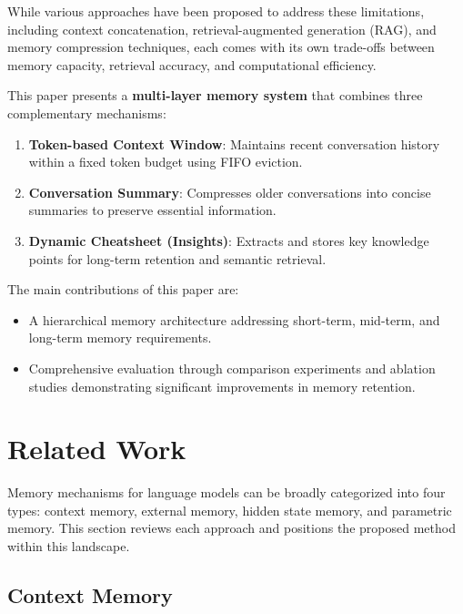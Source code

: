 \documentclass{article} %
\begin{document}
While various approaches have been proposed to address these limitations, including context concatenation, retrieval-augmented generation (RAG), and memory compression techniques, each comes with its own trade-offs between memory capacity, retrieval accuracy, and computational efficiency.

This paper presents a \textbf{multi-layer memory system} that combines three complementary mechanisms:

\begin{enumerate}
    \item \textbf{Token-based Context Window}: Maintains recent conversation history within a fixed token budget using FIFO eviction.
    \item \textbf{Conversation Summary}: Compresses older conversations into concise summaries to preserve essential information.
    \item \textbf{Dynamic Cheatsheet (Insights)}: Extracts and stores key knowledge points for long-term retention and semantic retrieval.
\end{enumerate}

The main contributions of this paper are:
\begin{itemize}
    \item A hierarchical memory architecture addressing short-term, mid-term, and long-term memory requirements.
    \item Comprehensive evaluation through comparison experiments and ablation studies demonstrating significant improvements in memory retention.
\end{itemize}

\section{Related Work}
\label{sec:related}

Memory mechanisms for language models can be broadly categorized into four types: context memory, external memory, hidden state memory, and parametric memory. This section reviews each approach and positions the proposed method within this landscape.

\subsection{Context Memory}
\end{document}

